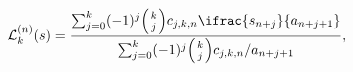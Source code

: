\[{\cal L}_{k}^{(n)}(s)=\frac{\sum_{j=0}^{k}(-1)^{j}{\left({{k}\atop{j}}\right)}%
c_{j,k,n}\ifrac{s_{n+j}}{a_{n+j+1}}}{\sum_{j=0}^{k}(-1)^{j}{\left({{k}\atop{j}%
}\right)}c_{j,k,n}/a_{n+j+1}},\]